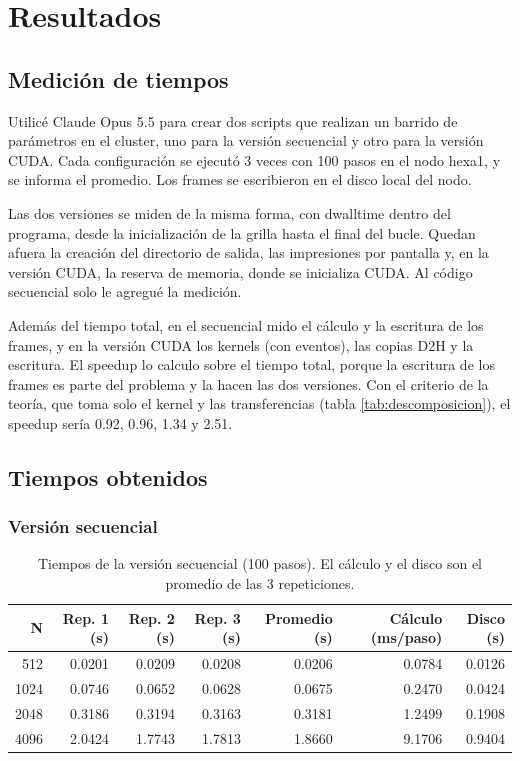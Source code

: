 \section{Resultados}

\subsection{Medición de tiempos}

Utilicé Claude Opus 5.5 para crear dos scripts que realizan un barrido de parámetros en el cluster, uno para la versión secuencial y otro para la versión CUDA. Cada configuración se ejecutó 3 veces con 100 pasos en el nodo hexa1, y se informa el promedio. Los frames se escribieron en el disco local del nodo.

Las dos versiones se miden de la misma forma, con dwalltime dentro del programa, desde la inicialización de la grilla hasta el final del bucle. Quedan afuera la creación del directorio de salida, las impresiones por pantalla y, en la versión CUDA, la reserva de memoria, donde se inicializa CUDA. Al código secuencial solo le agregué la medición.

Además del tiempo total, en el secuencial mido el cálculo y la escritura de los frames, y en la versión CUDA los kernels (con eventos), las copias D2H y la escritura. El speedup lo calculo sobre el tiempo total, porque la escritura de los frames es parte del problema y la hacen las dos versiones. Con el criterio de la teoría, que toma solo el kernel y las transferencias (tabla \ref{tab:descomposicion}), el speedup sería 0.92, 0.96, 1.34 y 2.51.

\subsection{Tiempos obtenidos}

\subsubsection*{Versión secuencial}

\begin{table}[H]
  \centering
  \begin{tabular}{rrrrrrr}
    \toprule
    N & Rep. 1 (s) & Rep. 2 (s) & Rep. 3 (s) & Promedio (s) & Cálculo (ms/paso) & Disco (s) \\
    \midrule
    512  & 0.0201 & 0.0209 & 0.0208 & 0.0206 & 0.0784 & 0.0126 \\
    1024 & 0.0746 & 0.0652 & 0.0628 & 0.0675 & 0.2470 & 0.0424 \\
    2048 & 0.3186 & 0.3194 & 0.3163 & 0.3181 & 1.2499 & 0.1908 \\
    4096 & 2.0424 & 1.7743 & 1.7813 & 1.8660 & 9.1706 & 0.9404 \\
    \bottomrule
  \end{tabular}
  \caption{Tiempos de la versión secuencial (100 pasos). El cálculo y el disco son el promedio de las 3 repeticiones.}
  \label{tab:secuencial}
\end{table}


